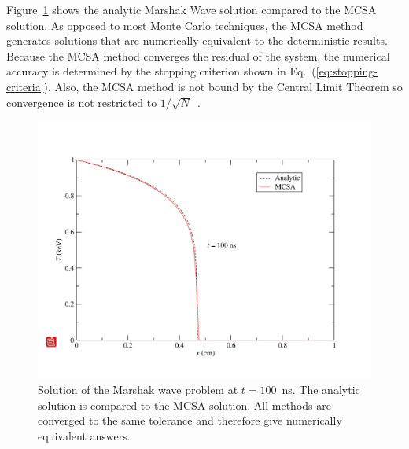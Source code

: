 \documentclass[preprint,12pt]{elsarticle}
\begin{document}
Figure~\ref{fig:marshak_10} shows the analytic Marshak Wave solution compared
to the MCSA solution.  As opposed to most Monte Carlo techniques, the MCSA
method generates solutions that are numerically equivalent to the
deterministic results.  Because the MCSA method converges the residual of the
system, the numerical accuracy is determined by the stopping criterion shown
in Eq.~(\ref{eq:stopping-criteria}).  Also, the MCSA method is not bound by
the Central Limit Theorem so convergence is not restricted to
$1/\sqrt{N}$~\cite{halton_1994,evans_2003}.
\begin{figure}[ht!]
  \centerline{ \includegraphics[width=5in,clip]{marshak_10.pdf}}
  \caption{ Solution of the Marshak wave problem at $t=100$~ns.  The analytic
    solution is compared to the MCSA solution.  All methods are converged to
    the same tolerance and therefore give numerically equivalent answers.}
  \label{fig:marshak_10}
\end{figure}
\end{document}
